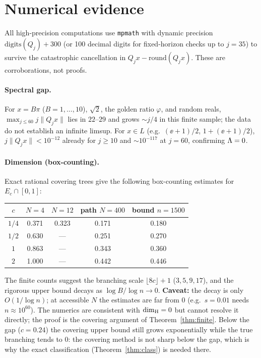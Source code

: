 \section{Numerical evidence}\label{sec:num}

All high-precision computations use \texttt{mpmath} with dynamic precision
$\mathrm{digits}(Q_j)+300$ (or 100 decimal digits for fixed-horizon checks up
to $j=35$) to survive the catastrophic cancellation in
$Q_jx-\mathrm{round}(Q_jx)$. These are corroborations, not proofs.

\paragraph{Spectral gap.} For $x=B\pi$ ($B=1,\dots,10$), $\sqrt2$, the golden
ratio $\varphi$, and random reals, $\max_{j\le60}j\|Q_jx\|$ lies in $22$--$29$
and grows $\sim j/4$ in this finite sample; the data do not establish an
infinite limsup. For $x\in L$ (e.g.\ $(\ee+1)/2$, $1+(\ee+1)/2$),
$j\|Q_jx\|<10^{-12}$ already for $j\ge10$ and $\sim10^{-117}$ at $j=60$,
confirming $\Lambda=0$.

\paragraph{Dimension (box-counting).} Exact rational covering trees give the
following box-counting estimates for $E_c\cap[0,1]$:
\begin{center}
\begin{tabular}{c|cccc}
$c$ & $N=4$ & $N=12$ & path $N=400$ & bound $n=1500$\\\hline
$1/4$ & 0.371 & 0.323 & 0.171 & 0.180\\
$1/2$ & 0.630 & --- & 0.251 & 0.270\\
$1$   & 0.863 & --- & 0.343 & 0.360\\
$2$   & 1.000 & --- & 0.442 & 0.446
\end{tabular}
\end{center}
The finite counts suggest the branching scale $\lfloor8c\rfloor+1$ ($3,5,9,17$), and
the rigorous upper bound decays as $\log B/\log n\to0$. \textbf{Caveat:} the
decay is only $O(1/\log n)$; at accessible $N$ the estimates are far from $0$
(e.g.\ $s=0.01$ needs $n\approx10^{60}$). The numerics are consistent with
$\dim_{\mathrm{H}}=0$ but cannot resolve it directly; the proof is the covering argument of
Theorem~\ref{thm:finite}. Below the gap ($c=0.24$) the covering upper bound
still grows exponentially while the true branching tends to $0$: the covering
method is not sharp below the gap, which is why the exact classification
(Theorem~\ref{thm:class}) is needed there.

